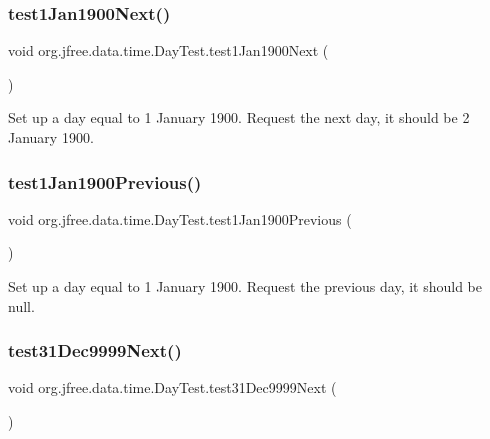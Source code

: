 \subsubsection{\texorpdfstring{test1\+Jan1900\+Next()}{test1Jan1900Next()}}
{\footnotesize\ttfamily void org.\+jfree.\+data.\+time.\+Day\+Test.\+test1\+Jan1900\+Next (\begin{DoxyParamCaption}{ }\end{DoxyParamCaption})}

Set up a day equal to 1 January 1900. Request the next day, it should be 2 January 1900. \mbox{\label{classorg_1_1jfree_1_1data_1_1time_1_1_day_test_abe741da7c1751c04f7ab094ed7711e07}} 
\subsubsection{\texorpdfstring{test1\+Jan1900\+Previous()}{test1Jan1900Previous()}}
{\footnotesize\ttfamily void org.\+jfree.\+data.\+time.\+Day\+Test.\+test1\+Jan1900\+Previous (\begin{DoxyParamCaption}{ }\end{DoxyParamCaption})}

Set up a day equal to 1 January 1900. Request the previous day, it should be null. \mbox{\label{classorg_1_1jfree_1_1data_1_1time_1_1_day_test_a58540379b628e1a9d6a2cc4bafa1db7a}} 
\subsubsection{\texorpdfstring{test31\+Dec9999\+Next()}{test31Dec9999Next()}}
{\footnotesize\ttfamily void org.\+jfree.\+data.\+time.\+Day\+Test.\+test31\+Dec9999\+Next (\begin{DoxyParamCaption}{ }\end{DoxyParamCaption})}

